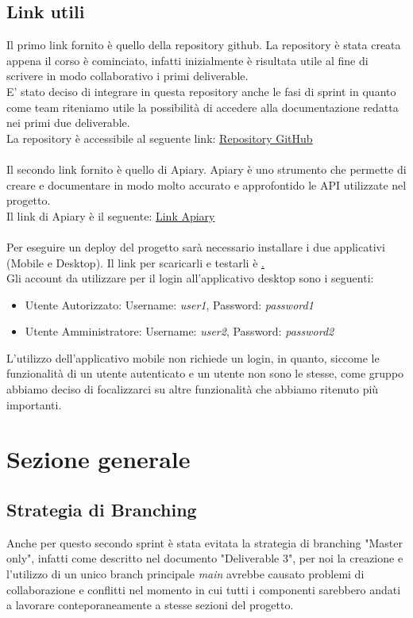\documentclass{article}
\begin{document}
\subsection{Link utili}
Il primo link fornito è quello della repository github. La repository è stata creata appena il corso è cominciato, infatti inizialmente è risultata utile al fine di scrivere in modo collaborativo i primi deliverable.\\
E' stato deciso di integrare in questa repository anche le fasi di sprint in quanto come team riteniamo utile la possibilità di accedere alla documentazione redatta nei primi due deliverable.\\
La repository è accessibile al seguente link: \href{https://github.com/ELI20ZIVI/BeeLive/}{Repository GitHub}\\ \\
Il secondo link fornito è quello di Apiary. Apiary è uno strumento che permette di creare e documentare in modo molto accurato e approfontido le API utilizzate nel progetto.\\
Il link di Apiary è il seguente: \href{https://beelive.docs.apiary.io/#}{Link Apiary}\\ \\
Per eseguire un deploy del progetto sarà necessario installare i due applicativi (Mobile e Desktop). Il link per scaricarli e testarli è \href{github-release-page}.\\
Gli account da utilizzare per il login all'applicativo desktop sono i seguenti:
\begin{itemize}
    \item Utente Autorizzato: Username: \textit{user1}, Password: \textit{password1}
    \item Utente Amministratore: Username: \textit{user2}, Password: \textit{password2}
\end{itemize}
L'utilizzo dell'applicativo mobile non richiede un login, in quanto, siccome le funzionalità di un utente autenticato e un utente non sono le stesse, come gruppo abbiamo deciso di focalizzarci su altre funzionalità che abbiamo ritenuto più importanti.

\clearpage

\section{Sezione generale}

\subsection{Strategia di Branching}
Anche per questo secondo sprint è stata evitata la strategia di branching "Master only", infatti come descritto nel documento "Deliverable 3", per noi la creazione e l'utilizzo di un unico branch principale \textit{main} avrebbe causato problemi di collaborazione e conflitti nel momento in cui tutti i componenti sarebbero andati a lavorare conteporaneamente a stesse sezioni del progetto. \\
\end{document}
